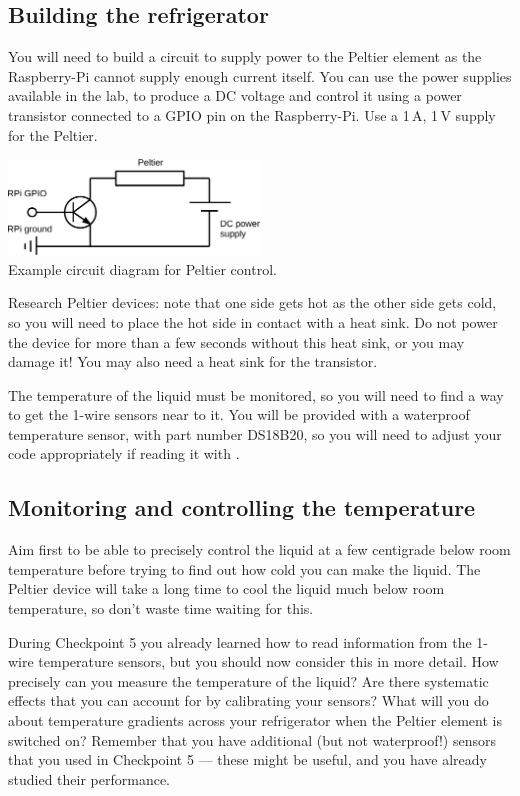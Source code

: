 \subsection{Building the refrigerator}

You will need to build a circuit to supply power to the Peltier element as the Raspberry-Pi cannot supply enough current itself.
You can use the power supplies available in the lab, to produce a DC voltage and control it using a power transistor connected to a GPIO pin on the Raspberry-Pi.
Use a 1\,A, 1\,V supply for the Peltier.

\begin{center}
	\includegraphics[width=0.5\textwidth]{figs/PeltierCircuit}\\
	{Example circuit diagram for Peltier control.}
\end{center}

Research Peltier devices: note that one side gets hot as the other side gets cold, so you will need to place the hot side in contact with a heat sink.
Do not power the device for more than a few seconds without this heat sink, or you may damage it!
You may also need a heat sink for the transistor.

The temperature of the liquid must be monitored, so you will need to find a way to get the 1-wire sensors near to it.
You will be provided with a waterproof temperature sensor, with part number DS18B20, so you will need to adjust your code appropriately if reading it with \webiopi.

\subsection{Monitoring and controlling the temperature}

Aim first to be able to precisely control the liquid at a few centigrade below room temperature before trying to find out how cold you can make the liquid.
The Peltier device will take a long time to cool the liquid much below room temperature, so don't waste time waiting for this.

During Checkpoint 5 you already learned how to read information from the 1-wire temperature sensors, but you should now consider this in more detail.
How precisely can you measure the temperature of the liquid?
Are there systematic effects that you can account for by calibrating your sensors?
What will you do about temperature gradients across your refrigerator when the Peltier element is switched on?
Remember that you have additional (but not waterproof!) sensors that you used in Checkpoint 5 --- these might be useful, and you have already studied their performance.

